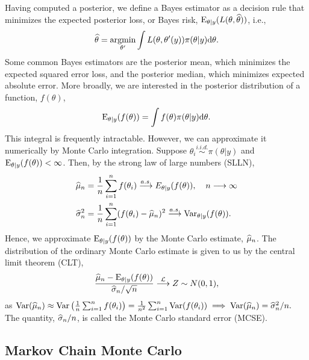 Having computed a posterior, we define a Bayes estimator as a decision rule that minimizes the expected posterior loss, or Bayes risk, $ \mathrm{E}_{\theta|y}(L(\theta,\widehat{\theta})) $, i.e., $$ \widehat{\theta} = \underset{\theta^\prime}{\mathrm{argmin}}\int L(\theta,\theta^\prime(y)) \pi(\theta|y)\mathrm{d}\theta .$$ Some common Bayes estimators are the posterior mean, which minimizes the expected squared error loss, and the posterior median, which minimizes expected absolute error. More broadly, we are interested in the posterior distribution of a function, $ f(\theta) $,  $$\mathrm{E}_{\theta|y}(f(\theta)) = \int f(\theta)\pi(\theta|y)\mathrm{d}\theta.$$
This integral is frequently intractable. However, we can approximate it numerically by Monte Carlo integration. Suppose $ \theta_i\overset{i.i.d.}{\sim}\pi(\theta|y) $ and $ \mathrm{E}_{\theta|y}(f(\theta))<\infty $. Then, by the strong law of large numbers (SLLN), 
\begin{align*}
\widehat{\mu}_n &= \frac{1}{n}\sum_{i=1}^n f(\theta_i) \overset{a.s.}{\longrightarrow} E_{\theta|y}(f(\theta)),\ \hspace{0.1in} n\longrightarrow\infty\\
\widehat{\sigma}^2_n &= \frac{1}{n}\sum_{i=1}^n (f(\theta_i) - \widehat{\mu}_n)^2 \overset{a.s.}{\longrightarrow}\mathrm{Var}_{\theta|y}(f(\theta)).
\end{align*}
Hence, we approximate $ \mathrm{E}_{\theta|y}(f(\theta)) $ by the Monte Carlo estimate, $ \widehat{\mu}_n $. The distribution of the ordinary Monte Carlo estimate is given to us by the central limit theorem (CLT), 
$$\frac{\widehat{\mu}_n - \mathrm{E}_{\theta|y}(f(\theta))}{\widehat{\sigma}_n/\sqrt{n}}\overset{\mathcal{L}}{\longrightarrow}Z\sim N(0,1),$$
as $ \mathrm{Var}(\widehat{\mu}_n) \approx \mathrm{Var}\left (\frac{1}{n}\sum_{i=1}^n f(\theta_i)\right ) = \frac{1}{n^2}\sum_{i=1}^n\mathrm{Var}(f(\theta_i)) \implies\mathrm{Var}(\widehat{\mu}_n) =\widehat{\sigma}_n^2 / n. $ The quantity, $ \widehat{\sigma}_n/n $, is called the Monte Carlo standard error (MCSE).  

\subsection{Markov Chain Monte Carlo}
\label{subsec:mcmc}

